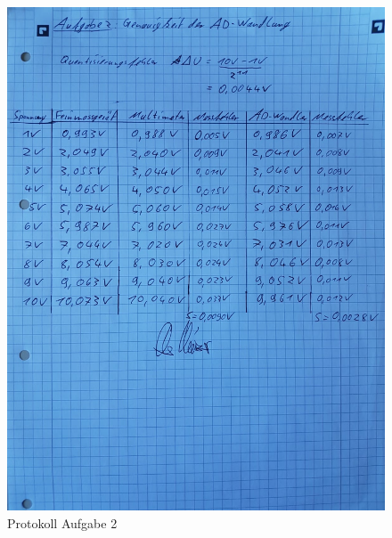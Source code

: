 \documentclass[12pt, oneside, a4paper, \docLanguage]{report}
\begin{document}
\begin{figure}[H]
	\centering\small
	\graphicspath{ {../versuch5/} }
	\includegraphics[width=.65\textwidth]{media/protokoll2}
	\caption{Protokoll Aufgabe 2}
	\label{fig:PROTOKOLL2}
\end{figure}
\end{document}
